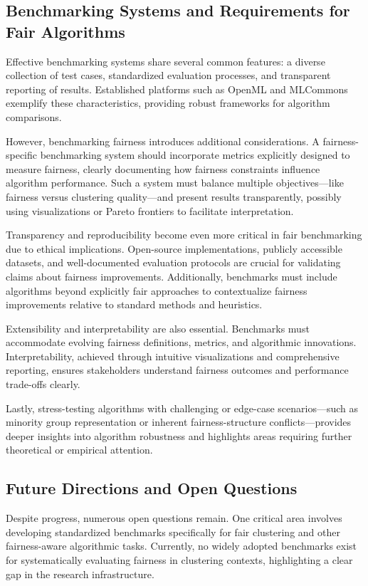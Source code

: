 \subsection{Benchmarking Systems and Requirements for Fair Algorithms}

Effective benchmarking systems share several common features: a
diverse collection of test cases, standardized evaluation processes,
and transparent reporting of results. Established platforms such as
OpenML and MLCommons exemplify these characteristics, providing
robust frameworks for algorithm comparisons.

However, benchmarking fairness introduces additional considerations.
A fairness-specific benchmarking system should incorporate metrics
explicitly designed to measure fairness, clearly documenting how
fairness constraints influence algorithm performance. Such a system
must balance multiple objectives—like fairness versus clustering
quality—and present results transparently, possibly using
visualizations or Pareto frontiers to facilitate interpretation.

Transparency and reproducibility become even more critical in fair
benchmarking due to ethical implications. Open-source
implementations, publicly accessible datasets, and well-documented
evaluation protocols are crucial for validating claims about fairness
improvements. Additionally, benchmarks must include algorithms beyond
explicitly fair approaches to contextualize fairness improvements
relative to standard methods and heuristics.

Extensibility and interpretability are also essential. Benchmarks
must accommodate evolving fairness definitions, metrics, and
algorithmic innovations. Interpretability, achieved through intuitive
visualizations and comprehensive reporting, ensures stakeholders
understand fairness outcomes and performance trade-offs clearly.

Lastly, stress-testing algorithms with challenging or edge-case
scenarios—such as minority group representation or inherent
fairness-structure conflicts—provides deeper insights into algorithm
robustness and highlights areas requiring further theoretical or
empirical attention.

\subsection{Future Directions and Open Questions}

Despite progress, numerous open questions remain. One critical area
involves developing standardized benchmarks specifically for fair
clustering and other fairness-aware algorithmic tasks. Currently, no
widely adopted benchmarks exist for systematically evaluating
fairness in clustering contexts, highlighting a clear gap in the
research infrastructure.

